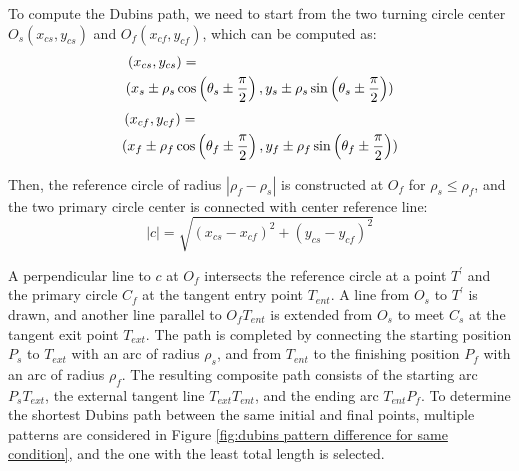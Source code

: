To compute the Dubins path, we need to start from the two turning circle center $O_s\left(x_{c s}, y_{c s}\right)$ and $O_f\left(x_{c f}, y_{c f}\right)$, which can be computed as:
\begin{align}
    &\left(x_{c s}, y_{c s}\right)=\\ \notag
        &(x_s \pm \rho_s \cos \left(\theta_s \pm \frac{\pi}{2}\right), y_s \pm \rho_s \sin \left(\theta_s \pm \frac{\pi}{2}\right)) 
\end{align}
\begin{align}
        &\left(x_{c f}, y_{c f}\right)=\\ \notag
        &(x_f \pm \rho_f \cos \left(\theta_f \pm \frac{\pi}{2}\right), y_f \pm \rho_f \sin \left(\theta_f \pm \frac{\pi}{2}\right))
\end{align}

Then, the reference circle of radius $\left|\rho_f-\rho_s\right|$ is constructed at $O_f$ for $\rho_s \leq \rho_f$, and the two primary circle center is connected with center reference line:
\begin{equation}
    |c|=\sqrt{\left(x_{c s}-x_{c f}\right)^2+\left(y_{c s}-y_{c f}\right)^2}
\end{equation}

A perpendicular line to $c$ at $O_f$ intersects the reference circle at a point $T^{\prime}$ and the primary circle $C_f$ at the tangent entry point $T_{ent}$. A line from $O_s$ to $T^{\prime}$ is drawn, and another line parallel to $O_f T_{ent}$ is extended from $O_s$ to meet $C_s$ at the tangent exit point $T_{ext}$. The path is completed by connecting the starting position $P_s$ to $T_{ext}$ with an arc of radius $\rho_s$, and from $T_{ent}$ to the finishing position $P_f$ with an arc of radius $\rho_f$. The resulting composite path consists of the starting arc $P_s T_{ext}$, the external tangent line $T_{ext} T_{ent}$, and the ending arc $T_{ent} P_f$. To determine the shortest Dubins path between the same initial and final points, multiple patterns are considered in Figure \ref{fig:dubins pattern difference for same condition}, and the one with the least total length is selected.

